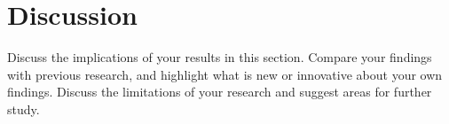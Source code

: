 \section{Discussion}
Discuss the implications of your results in this section. Compare your findings with previous research, and highlight what is new or innovative about your own findings. Discuss the limitations of your research and suggest areas for further study.
